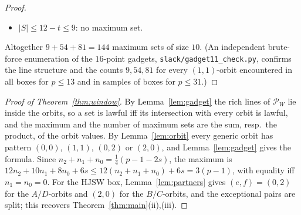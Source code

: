 \documentclass[11pt]{article}
\theoremstyle{remark}
\newcommand{\Pset}{\mathcal{P}}
\begin{document}
\begin{proof}
\begin{itemize}
 two of three ($3\cdot3$): $36$ sets; for $\{\kappa_A,\bar\tau\}$: $B'$ $2$ ways, $A''$ ($\ni\bar\tau$) $3$ ways, $A'$ forced,
 $B''$ $3$ ways: $18$; for $\{\bar\sigma,\kappa_B\}$: symmetrically $18$; for $\{\bar\sigma,\bar\tau\}$: $B''$ $3$, $A''$ $3$,
 $A'$, $B'$ forced: $9$.  Total $36+18+18+9=81$.
\item[$t\ge3$:] $|S|\le12-t\le9$: no maximum set.
\end{itemize}
Altogether $9+54+81=144$ maximum sets of size $10$.  (An independent brute-force enumeration of the $16$-point gadgets,
\texttt{slack/gadget11\_check.py}, confirms the line structure and the counts $9,54,81$ for every $(1,1)$-orbit encountered
in all boxes for $p\le13$ and in samples of boxes for $p\le31$.)
\end{proof}

\begin{proof}[Proof of Theorem~\ref{thm:window}]
By Lemma~\ref{lem:gadget} the rich lines of $\Pset_W$ lie inside the orbits, so a set is lawful iff its intersection with
every orbit is lawful, and the maximum and the number of maximum sets are the sum, resp.\ the product, of the orbit values.
By Lemma~\ref{lem:orbit} every generic orbit has pattern $(0,0)$, $(1,1)$, $(0,2)$ or $(2,0)$, and Lemma~\ref{lem:gadget}
gives the formula.  Since $n_2+n_1+n_0=\tfrac14(p-1-2s)$, the maximum is $12n_2+10n_1+8n_0+6s\le12(n_2+n_1+n_0)+6s=3(p-1)$,
with equality iff $n_1=n_0=0$.  For the HJSW box, Lemma~\ref{lem:partners} gives $(e,f)=(0,2)$ for the $A/D$-orbits and $(2,0)$ for the
$B/C$-orbits, and the exceptional pairs are split; this recovers Theorem~\ref{thm:main}(ii),(iii).
\end{proof}
\end{document}
